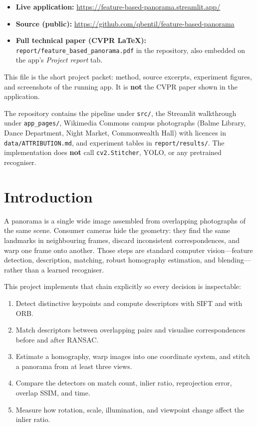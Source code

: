\documentclass[11pt,a4paper]{article}
\begin{document}
\begin{itemize}
  \item \textbf{Live application:} \url{https://feature-based-panorama.streamlit.app/}
  \item \textbf{Source (public):} \url{https://github.com/qbentil/feature-based-panorama}
  \item \textbf{Full technical paper (CVPR LaTeX):} \texttt{report/feature\_based\_panorama.pdf}
        in the repository, also embedded on the app's \emph{Project report} tab.
\end{itemize}

This file is the short project packet: method, source excerpts, experiment
figures, and screenshots of the running app. It is \textbf{not} the CVPR paper
shown in the application.

The repository contains the pipeline under \texttt{src/}, the Streamlit
walkthrough under \texttt{app\_pages/}, Wikimedia Commons campus photographs
(Balme Library, Dance Department, Night Market, Commonwealth Hall) with
licences in \texttt{data/ATTRIBUTION.md}, and experiment tables in
\texttt{report/results/}. The implementation does \textbf{not} call
\texttt{cv2.Stitcher}, YOLO, or any pretrained recogniser.

\section{Introduction}

A panorama is a single wide image assembled from overlapping photographs of
the same scene. Consumer cameras hide the geometry: they find the same
landmarks in neighbouring frames, discard inconsistent correspondences, and
warp one frame onto another. Those steps are standard computer vision---feature
detection, description, matching, robust homography estimation, and
blending---rather than a learned recogniser.

This project implements that chain explicitly so every decision is inspectable:

\begin{enumerate}
  \item Detect distinctive keypoints and compute descriptors with SIFT and with ORB.
  \item Match descriptors between overlapping pairs and visualise correspondences before and after RANSAC.
  \item Estimate a homography, warp images into one coordinate system, and stitch a panorama from at least three views.
  \item Compare the detectors on match count, inlier ratio, reprojection error, overlap SSIM, and time.
  \item Measure how rotation, scale, illumination, and viewpoint change affect the inlier ratio.
\end{enumerate}
\end{document}
